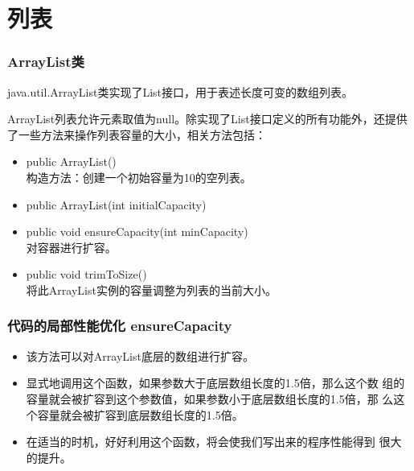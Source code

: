\section{列表}

\begin{frame}[fragile] %
  \frametitle{ArrayList类}

  java.util.ArrayList类实现了List接口，用于表述长度可变的数组列表。

  ArrayList列表允许元素取值为null。除实现了List接口定义的所有功能外，还提供了一些方法来操作列表容量的大小，相关方法包括：

  \begin{itemize}\kai
  \item public ArrayList()\\构造方法：创建一个初始容量为10的空列表。
  \item public ArrayList(int initialCapacity)
  \item {\Red public void ensureCapacity(int minCapacity)\\对容器进行扩容。}
  \item public void trimToSize() \\将此ArrayList实例的容量调整为列表的当前大小。
  \end{itemize}
\end{frame}

\begin{frame}[fragile]
  \frametitle{代码的局部性能优化 ensureCapacity}


  \begin{itemize}\kai
  \item 该方法可以对ArrayList底层的数组进行扩容。
  \item 显式地调用这个函数，如果参数大于底层数组长度的1.5倍，那么这个数
    组的容量就会被扩容到这个参数值，如果参数小于底层数组长度的1.5倍，那
    么这个容量就会被扩容到底层数组长度的1.5倍。
  \item 在适当的时机，好好利用这个函数，将会使我们写出来的程序性能得到
    很大的提升。
  \end{itemize}

\end{frame}

